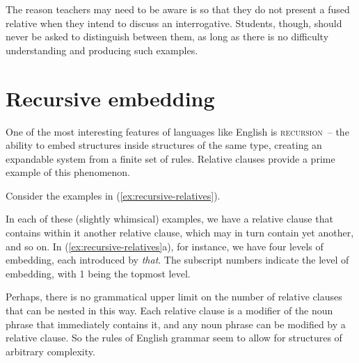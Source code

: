 The reason teachers may need to be aware is so that they do not present a fused relative when they intend to discuss an interrogative. Students, though, should never be asked to distinguish between them, as long as there is no difficulty understanding and producing such examples.

\section{Recursive embedding}

One of the most interesting features of languages like English is \textsc{recursion}~-- the ability to embed structures inside structures of the same type, creating an expandable system from a finite set of rules. Relative clauses provide a prime example of this phenomenon.

Consider the examples in (\ref{ex:recursive-relatives}).
\ea \label{ex:recursive-relatives}
    \z
\z

In each of these (slightly whimsical) examples, we have a relative clause that contains within it another relative clause, which may in turn contain yet another, and so on. In (\ref{ex:recursive-relatives}a), for instance, we have four levels of embedding, each introduced by \textit{that}. The subscript numbers indicate the level of embedding, with 1 being the topmost level.

Perhaps, there is no grammatical upper limit on the number of relative clauses that can be nested in this way. Each relative clause is a modifier of the noun phrase that immediately contains it, and any noun phrase can be modified by a relative clause. So the rules of English grammar seem to allow for structures of arbitrary complexity.

